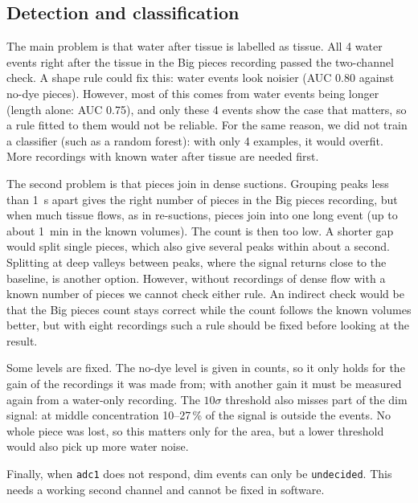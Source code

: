 \subsection{Detection and classification}
\label{sec:detection-discussion}
The main problem is that water after tissue is labelled as tissue. All 4 water events right after the tissue in
the Big pieces recording passed the two-channel check.
A shape rule could fix this: water events look noisier (AUC 0.80 against no-dye pieces).
However, most of this comes from water events being longer (length alone: AUC 0.75), and only
these 4 events show the case that matters, so a rule fitted to them would not be reliable. For the
same reason, we did not train a classifier (such as a random forest): with only 4 examples, it
would overfit. More recordings with known water after tissue are needed first.

The second problem is that pieces join in dense suctions. Grouping peaks less than \SI{1}{\second} apart gives
the right number of pieces in the Big pieces recording, but when much tissue flows, as in
re-suctions, pieces join into one long event (up to about \SI{1}{\minute} in the known volumes).
The count is then too low. A shorter gap would split single pieces, which also give several
peaks within about a second. Splitting at deep valleys between peaks, where the signal returns
close to the baseline, is another option. However, without recordings of dense flow with a known
number of pieces we cannot check either rule. An indirect check would be that the Big pieces
count stays correct while the count follows the known volumes better, but with eight recordings
such a rule should be fixed before looking at the result.

Some levels are fixed. The no-dye level is given in counts, so it only holds for the gain of the
recordings it was made from; with another gain it must be measured again from a water-only
recording. The $10\sigma$ threshold also misses part of the dim signal: at middle concentration
10--27\,\% of the signal is outside the events. No whole piece was lost, so this matters only
for the area, but a lower threshold would also pick up more water noise.

Finally, when \texttt{adc1} does not respond, dim events can only be
\texttt{undecided}. This needs a working second channel and cannot be fixed in software.
